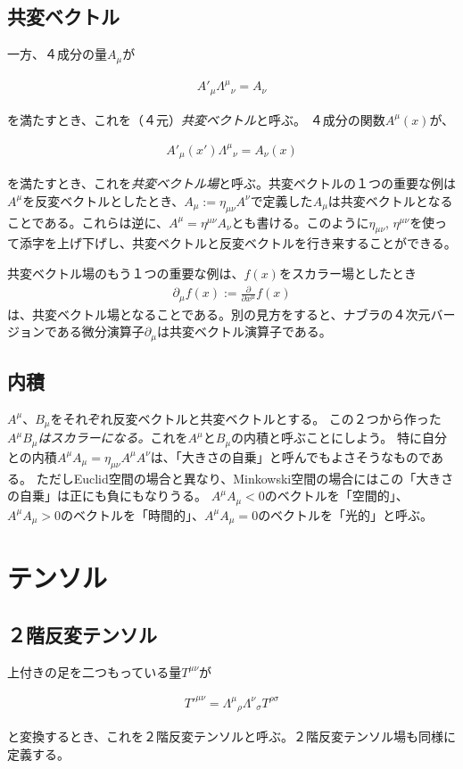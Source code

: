 \documentclass[report,paper=a4, fontsize=12pt, line_length=16cm, number_of_lines=33,dvipdfmx]{jlreq}
\newenvironment{important}{\begin{tcolorbox}[
  colback = white,
  colframe = red!35,
  boxrule = 2mm,
  fonttitle = \bfseries,
  after = \noindent] }{\end{tcolorbox}}
\numberwithin{equation}{chapter}
\newcommand{\del}{\partial}
\begin{document}
\subsection{共変ベクトル}
一方、４成分の量$A_{\mu}$が
\begin{important}
\begin{align}
A'_{\mu}\Lambda^{\mu}{}_{\nu}=A_{\nu}
\end{align}
\end{important}
を満たすとき、これを（４元）\emph{共変ベクトル}と呼ぶ。
４成分の関数$A^{\mu}(x)$が、
\begin{important}
\begin{align}
A'_{\mu}(x')\Lambda^{\mu}{}_{\nu}=A_{\nu}(x)
\end{align}
\end{important}
を満たすとき、これを\emph{共変ベクトル場}と呼ぶ。共変ベクトルの１つの重要な例は$A^{\mu}$を反変ベクトルとしたとき、$A_{\mu}:=\eta_{\mu\nu}A^{\nu}$で定義した$A_{\mu}$は共変ベクトルとなることである。これらは逆に、$A^{\mu}=\eta^{\mu\nu}A_{\nu}$とも書ける。このように$\eta_{\mu\nu}$, $\eta^{\mu\nu}$を使って添字を上げ下げし、共変ベクトルと反変ベクトルを行き来することができる。

共変ベクトル場のもう１つの重要な例は、$f(x)$をスカラー場としたとき
\begin{align}
\del_{\mu}f(x):=\frac{\del}{\del x^{\mu}} f(x)
\end{align}
は、共変ベクトル場となることである。別の見方をすると、ナブラの４次元バージョンである微分演算子$\del_{\mu}$は共変ベクトル演算子である。

\subsection{内積}
$A^{\mu}$、$B_{\mu}$をそれぞれ反変ベクトルと共変ベクトルとする。
この２つから作った\emph{$A^{\mu}B_{\mu}$はスカラーになる。}これを$A^{\mu}$と$B_{\mu}$の内積と呼ぶことにしよう。
特に自分との内積$A^{\mu}A_{\mu}=\eta_{\mu\nu}A^{\mu}A^{\nu}$は、「大きさの自乗」と呼んでもよさそうなものである。
ただしEuclid空間の場合と異なり、Minkowski空間の場合にはこの「大きさの自乗」は正にも負にもなりうる。
$A^{\mu}A_{\mu}<0$のベクトルを「空間的」、$A^{\mu}A_{\mu}>0$のベクトルを「時間的」、$A^{\mu}A_{\mu}=0$のベクトルを「光的」と呼ぶ。

\section{テンソル}
\subsection{２階反変テンソル}
上付きの足を二つもっている量$T^{\mu\nu}$が
\begin{important}
\begin{align}
 T'^{\mu\nu}=\Lambda^{\mu}{}_{\rho}\Lambda^{\nu}{}_{\sigma}T^{\rho\sigma}
\end{align}
\end{important}
と変換するとき、これを２階反変テンソルと呼ぶ。２階反変テンソル場も同様に定義する。
\end{document}
